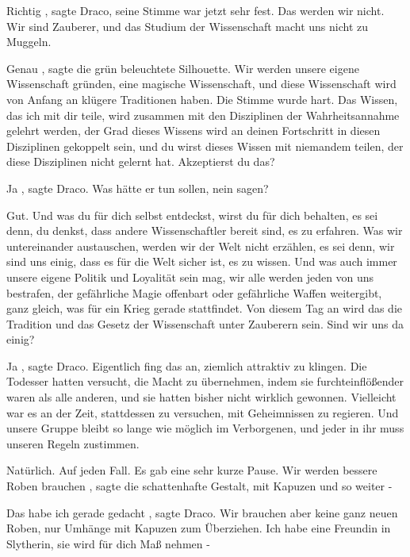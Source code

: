 \glqq Richtig\grqq{} , sagte Draco, seine Stimme war jetzt sehr fest. \glqq Das
werden wir nicht. Wir sind Zauberer, und das Studium der Wissenschaft macht uns
nicht zu Muggeln.\grqq{}

\glqq Genau\grqq{} , sagte die grün beleuchtete Silhouette. \glqq Wir werden
unsere eigene Wissenschaft gründen, eine magische Wissenschaft, und diese
Wissenschaft wird von Anfang an klügere Traditionen haben.\grqq{} Die Stimme
wurde hart. \glqq Das Wissen, das ich mit dir teile, wird zusammen mit den
Disziplinen der Wahrheitsannahme gelehrt werden, der Grad dieses Wissens wird an
deinen Fortschritt in diesen Disziplinen gekoppelt sein, und du wirst dieses
Wissen mit niemandem teilen, der diese Disziplinen nicht gelernt hat.
Akzeptierst du das?\grqq{}

\glqq Ja\grqq{} , sagte Draco. Was hätte er tun sollen, nein sagen?

\glqq Gut. Und was du für dich selbst entdeckst, wirst du für dich behalten, es
sei denn, du denkst, dass andere Wissenschaftler bereit sind, es zu erfahren.
Was wir untereinander austauschen, werden wir der Welt nicht erzählen, es sei
denn, wir sind uns einig, dass es für die Welt sicher ist, es zu wissen. Und was
auch immer unsere eigene Politik und Loyalität sein mag, wir alle werden jeden
von uns bestrafen, der gefährliche Magie offenbart oder gefährliche Waffen
weitergibt, ganz gleich, was für ein Krieg gerade stattfindet. Von diesem Tag an
wird das die Tradition und das Gesetz der Wissenschaft unter Zauberern sein.
Sind wir uns da einig?\grqq{}

\glqq Ja\grqq{} , sagte Draco. Eigentlich fing das an, ziemlich attraktiv zu
klingen. Die Todesser hatten versucht, die Macht zu übernehmen, indem sie
furchteinflößender waren als alle anderen, und sie hatten bisher nicht wirklich
gewonnen. Vielleicht war es an der Zeit, stattdessen zu versuchen, mit
Geheimnissen zu regieren. \glqq Und unsere Gruppe bleibt so lange wie möglich im
Verborgenen, und jeder in ihr muss unseren Regeln zustimmen.\grqq{}

\glqq Natürlich. Auf jeden Fall.\grqq{} Es gab eine sehr kurze Pause. \glqq Wir
werden bessere Roben brauchen\grqq{} , sagte die schattenhafte Gestalt, \glqq
mit Kapuzen und so weiter -\grqq{}

\glqq Das habe ich gerade gedacht\grqq{} , sagte Draco. \glqq Wir brauchen aber
keine ganz neuen Roben, nur Umhänge mit Kapuzen zum Überziehen. Ich habe eine
Freundin in Slytherin, sie wird für dich Maß nehmen -\grqq{}

